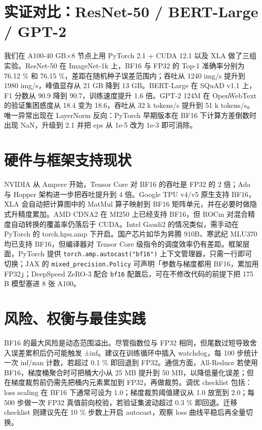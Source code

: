 \chapter{实证对比：ResNet-50 / BERT-Large / GPT-2}
我们在 A100-40 GB×8 节点上用 PyTorch 2.1 + CUDA 12.1 以及 XLA 做了三组实验。ResNet-50 在 ImageNet-1k 上，BF16 与 FP32 的 Top-1 准确率分别为 76.12 \%{} 和 76.15 \%{}，差距在随机种子误差范围内；吞吐从 1240 img/s 提升到 1980 img/s，峰值显存从 21 GB 降到 13 GB。BERT-Large 在 SQuAD v1.1 上，F1 分数从 90.9 降到 90.7，训练速度提升 1.6 倍。GPT-2 124M 在 OpenWebText 的验证集困惑度从 18.4 变为 18.6，吞吐从 32 k tokens/s 提升到 51 k tokens/s。唯一异常出现在 LayerNorm 反向：PyTorch 早期版本在 BF16 下计算方差倒数时出现 NaN，升级到 2.1 并把 eps 从 1e-5 改为 1e-3 即可消除。\par
\chapter{硬件与框架支持现状}
NVIDIA 从 Ampere 开始，Tensor Core 对 BF16 的吞吐是 FP32 的 2 倍；Ada 与 Hopper 架构进一步把吞吐提升到 4 倍。Google TPU v4/v5 原生支持 BF16，XLA 会自动把计算图中的 MatMul 算子映射到 BF16 矩阵单元，并在必要时做隐式升精度累加。AMD CDNA2 在 MI250 上已经支持 BF16，但 ROCm 对混合精度自动转换的覆盖率仍落后于 CUDA。Intel Gaudi2 的情况类似，需手动在 PyTorch 的 torch.hpu.amp 下开启。国产芯片如华为昇腾 910B、寒武纪 MLU370 均已支持 BF16，但编译器对 Tensor Core 级指令的调度效率仍有差距。框架层面，PyTorch 提供 \texttt{torch.amp.autocast("bf16")} 上下文管理器，只需一行即可切换；JAX 的 \texttt{mixed\_{}precision.Policy} 可声明「参数与梯度都用 BF16，累加用 FP32」；DeepSpeed ZeRO-3 配合 \texttt{bf16} 配置后，可在不修改代码的前提下把 175 B 模型塞进 8 张 A100。\par
\chapter{风险、权衡与最佳实践}
BF16 的最大风险是动态范围溢出。尽管指数位与 FP32 相同，但尾数过短导致舍入误差累积后仍可能触发 ±inf。建议在训练循环中插入 watchdog，每 100 步统计一次 inf/nan 计数，若超过 0.1 \%{} 即回退到 FP32。通信方面，All-Reduce 若使用 BF16，梯度桶聚合时可把桶大小从 25 MB 提升到 50 MB，以降低量化误差；但在梯度裁剪前仍需先把桶内元素累加到 FP32，再做裁剪。调优 checklist 包括：loss scaling 在 BF16 下通常可设为 1.0；梯度裁剪阈值建议从 1.0 放宽到 2.0；每 500 步做一次 FP32 真值前向校验，若验证集波动超过 0.3 \%{} 即回退。迁移 checklist 则建议先在 10 \%{} 步数上开启 autocast，观察 loss 曲线平稳后再全量切换。\par
